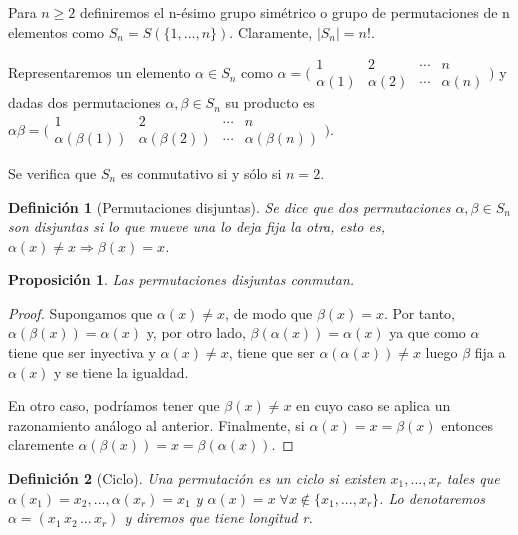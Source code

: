 \documentclass{article}
\theoremstyle{theorem-style}  %
\newtheorem{proposition}[theorem]{Proposición}
\theoremstyle{definition-style}
\newtheorem{definition}{Definición}[section]
\theoremstyle{example-style}
\begin{document}
Para $n \ge 2$ definiremos el n-ésimo grupo simétrico o grupo de permutaciones de n elementos como $S_n = S(\{1,...,n\})$. Claramente, $|S_n| = n!$.

Representaremos un elemento $\alpha \in S_n$ como 
$\alpha = \bigl(\begin{smallmatrix}
  1 & 2 & \cdots & n \\
  \alpha(1) & \alpha(2) & \cdots & \alpha(n) 
\end{smallmatrix}\bigr)$
y dadas dos permutaciones $\alpha,\beta \in S_n$ su producto es 
$\alpha \beta = \bigl(\begin{smallmatrix}
  1 & 2 & \cdots & n \\
  \alpha(\beta(1)) & \alpha(\beta(2)) & \cdots & \alpha(\beta(n)) 
\end{smallmatrix}\bigr)$.

Se verifica que $S_n$ es conmutativo si y sólo si $n=2$.

\begin{definition}[Permutaciones disjuntas]
Se dice que dos permutaciones $\alpha,\beta \in S_n$ son disjuntas si lo que mueve una lo deja fija la otra, esto es, $\alpha(x) \neq x \Rightarrow \beta(x) = x$.
\end{definition}

\begin{proposition}
Las permutaciones disjuntas conmutan.
\end{proposition}
\begin{proof}
Supongamos que $	\alpha(x) \neq x$, de modo que $\beta(x) = x$. Por tanto, $\alpha(\beta(x)) = \alpha(x)$ y, por otro lado, $\beta(\alpha(x)) = \alpha(x)$ ya que como $\alpha$ tiene que ser inyectiva y $\alpha(x) \neq x$, tiene que ser $\alpha(\alpha(x)) \neq x$ luego $\beta$ fija a $\alpha(x)$ y se tiene la igualdad.

En otro caso, podríamos tener que $\beta(x) \neq x$ en cuyo caso se aplica un razonamiento análogo al anterior. Finalmente, si $\alpha(x) = x = \beta(x)$ entonces claremente $\alpha(\beta(x)) = x = \beta(\alpha(x))$.
\end{proof}

\begin{definition}[Ciclo]
Una permutación es un ciclo si existen $x_1,...,x_r$ tales que $\alpha(x_1) = x_2,...,\alpha(x_r) = x_1$ y $\alpha(x) = x \; \forall x \notin \{x_1,...,x_r\}$. Lo denotaremos $\alpha = (x_1 \, x_2 \, ... \, x_r)$ y diremos que tiene longitud r. 
\end{definition}
\end{document}
